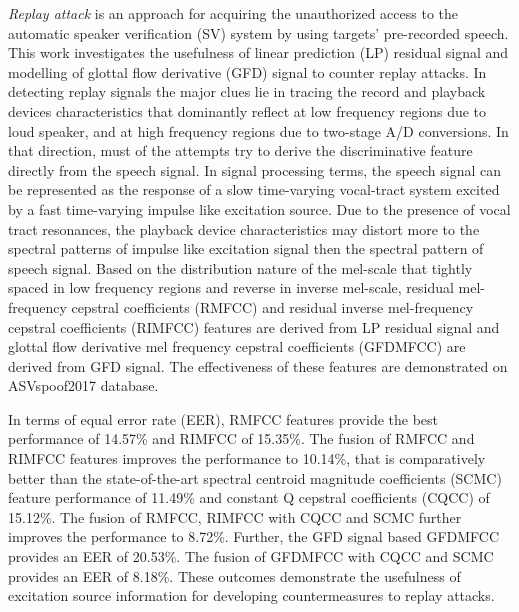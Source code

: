 

\setcounter{secnumdepth}{2}




\begingroup


{\it Replay attack} is an approach for acquiring the unauthorized access to the automatic speaker verification (SV) system by using targets' pre-recorded speech. This work investigates the usefulness of linear prediction (LP) residual signal and modelling of glottal flow derivative (GFD) signal to counter replay attacks. In detecting replay signals the major clues lie in tracing the record and playback devices characteristics that dominantly reflect at low frequency regions due to loud speaker, and at high frequency regions due to two-stage A/D conversions. In that direction, must of the attempts try to derive the discriminative feature directly from the speech signal. In signal processing terms, the speech signal can be represented as the response of a slow time-varying vocal-tract system excited by a fast time-varying impulse like excitation source. Due to the presence of vocal tract resonances, the playback device characteristics may distort more to the spectral patterns of impulse like excitation signal then the spectral pattern of speech signal. Based on the distribution nature of the mel-scale that tightly spaced in low frequency regions and reverse in inverse mel-scale, residual mel-frequency cepstral coefficients (RMFCC) and residual inverse mel-frequency cepstral coefficients (RIMFCC) features are derived from LP residual signal and glottal flow derivative mel frequency cepstral coefficients (GFDMFCC) are derived from GFD signal. The effectiveness of these features are demonstrated on ASVspoof2017 database.

In terms of equal error rate (EER), RMFCC features provide the best performance of 14.57\% and RIMFCC of 15.35\%. The fusion of RMFCC and RIMFCC features improves the performance to 10.14\%, that is comparatively better than the state-of-the-art spectral centroid magnitude coefficients (SCMC) feature performance of 11.49\% and constant Q cepstral coefficients (CQCC) of 15.12\%. The fusion of RMFCC, RIMFCC with CQCC and SCMC further improves the performance to 8.72\%. Further, the GFD signal based GFDMFCC provides an EER of 20.53\%. The fusion of GFDMFCC with CQCC and SCMC provides an EER of 8.18\%. These outcomes demonstrate the usefulness of excitation source information for developing countermeasures to replay attacks. 


